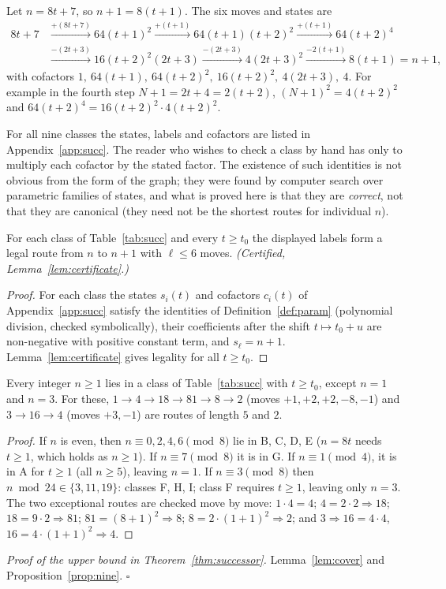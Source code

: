 \begin{example}\label{ex:G}
Let $n=8t+7$, so $n+1=8(t+1)$. The six moves and states are
\begin{align*}
8t+7&\xrightarrow{+(8t+7)}64(t+1)^2 \xrightarrow{+(t+1)} 64(t+1)(t+2)^2\xrightarrow{+(t+1)}64(t+2)^4\\
&\xrightarrow{-(2t+3)}16(t+2)^2(2t+3)\xrightarrow{-(2t+3)}4(2t+3)^2\xrightarrow{-2(t+1)}8(t+1)=n+1,
\end{align*}
with cofactors $1,\ 64(t+1),\ 64(t+2)^2,\ 16(t+2)^2,\ 4(2t+3),\ 4$. For example in the fourth step $N+1=2t+4=2(t+2)$, $(N+1)^2=4(t+2)^2$ and $64(t+2)^4=16(t+2)^2\cdot4(t+2)^2$.
\end{example}

For all nine classes the states, labels and cofactors are listed in Appendix~\ref{app:succ}. The reader who wishes to check a class by hand has only to multiply each cofactor by the stated factor. The existence of such identities is not obvious from the form of the graph; they were found by computer search over parametric families of states, and what is proved here is that they are \emph{correct}, not that they are canonical (they need not be the shortest routes for individual $n$).

\begin{proposition}\label{prop:nine}
For each class of Table~\ref{tab:succ} and every $t\ge t_0$ the displayed labels form a legal route from $n$ to $n+1$ with $\ell\le6$ moves. \emph{(Certified, Lemma~\ref{lem:certificate}.)}
\end{proposition}
\begin{proof} For each class the states $s_i(t)$ and cofactors $c_i(t)$ of Appendix~\ref{app:succ} satisfy the identities of Definition~\ref{def:param} (polynomial division, checked symbolically), their coefficients after the shift $t\mapsto t_0+u$ are non-negative with positive constant term, and $s_\ell=n+1$. Lemma~\ref{lem:certificate} gives legality for all $t\ge t_0$. \end{proof}

\begin{lemma}[Coverage]\label{lem:cover}
Every integer $n\ge1$ lies in a class of Table~\ref{tab:succ} with $t\ge t_0$, except $n=1$ and $n=3$. For these, $1\to4\to18\to81\to8\to2$ (moves $+1,+2,+2,-8,-1$) and $3\to16\to4$ (moves $+3,-1$) are routes of length $5$ and $2$.
\end{lemma}
\begin{proof} If $n$ is even, then $n\equiv0,2,4,6\pmod8$ lie in B, C, D, E ($n=8t$ needs $t\ge1$, which holds as $n\ge1$). If $n\equiv7\pmod 8$ it is in G. If $n\equiv1\pmod4$, it is in A for $t\ge1$ (all $n\ge5$), leaving $n=1$. If $n\equiv3\pmod8$ then $n\bmod24\in\{3,11,19\}$: classes F, H, I; class F requires $t\ge1$, leaving only $n=3$. The two exceptional routes are checked move by move: $1\cdot4=4$; $4=2\cdot2\Rightarrow18$; $18=9\cdot2\Rightarrow81$; $81=(8+1)^2\Rightarrow8$; $8=2\cdot(1+1)^2\Rightarrow2$; and $3\Rightarrow16=4\cdot4$, $16=4\cdot(1+1)^2\Rightarrow4$. \end{proof}
\emph{Proof of the upper bound in Theorem~\ref{thm:successor}.} Lemma~\ref{lem:cover} and Proposition~\ref{prop:nine}. \hfill$\square$

